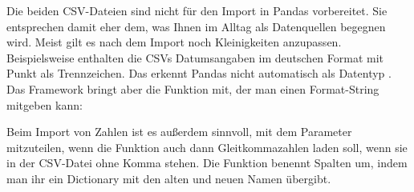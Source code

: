 Die beiden CSV-Dateien sind nicht für den Import in Pandas vorbereitet. Sie entsprechen damit eher dem, was Ihnen im Alltag als Datenquellen begegnen wird. Meist gilt es nach dem Import noch Kleinigkeiten anzupassen. Beispielsweise enthalten die CSVs Datumsangaben im deutschen Format mit Punkt als Trennzeichen. Das erkennt Pandas nicht automatisch als Datentyp . Das Framework bringt aber die Funktion  mit, der man einen Format-String mitgeben kann:

\medskip










	









\medskip

Beim Import von Zahlen ist es außerdem sinnvoll,  mit dem Parameter  mitzuteilen, wenn die Funktion auch dann Gleitkommazahlen laden soll, wenn sie in der CSV-Datei ohne Komma stehen. Die Funktion  benennt Spalten um, indem man ihr ein Dictionary mit den alten und neuen Namen übergibt.

